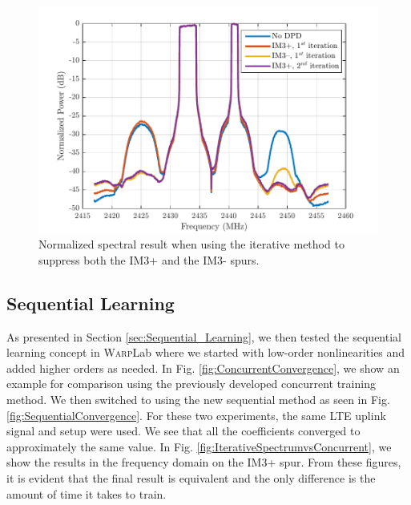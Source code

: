 \begin{figure}[t!] 
\centering
\includegraphics[width=0.9\columnwidth]{Figures/RightThenLeft_NEW}
\caption{Normalized spectral result when using the iterative method to suppress both the IM3+ and the IM3- spurs.}
\label{fig:RightThenLeft}
\end{figure}

\subsection{Sequential Learning}
As presented in Section \ref{sec:Sequential_Learning}, we then tested the sequential learning concept in \textsc{Warp}Lab where we started with low-order nonlinearities and added higher orders as needed. 
In Fig. \ref{fig:ConcurrentConvergence}, we show an example for comparison using the previously developed concurrent training method. 
We then switched to using the new sequential method as seen in Fig. \ref{fig:SequentialConvergence}. For these two experiments, the same LTE uplink signal and setup were used. 
We see that all the coefficients converged to approximately the same value. 
In Fig. \ref{fig:IterativeSpectrumvsConcurrent}, we show the results in the frequency domain on the IM3+ spur. 
From these figures, it is evident that the final result is equivalent and the only difference is the amount of time it takes to train.

